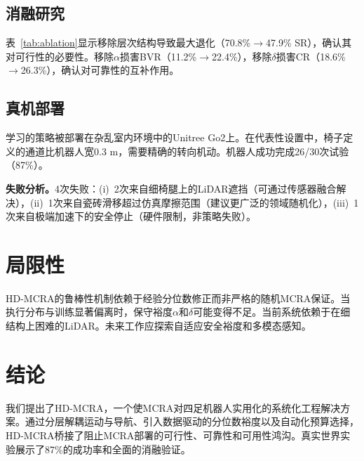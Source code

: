 \documentclass{article}
\begin{document}
\subsection{消融研究}

表~\ref{tab:ablation}显示移除层次结构导致最大退化（70.8\%$\to$47.9\% SR），确认其对可行性的必要性。移除$\alpha$损害BVR（11.2\%$\to$22.4\%），移除$\delta$损害CR（18.6\%$\to$26.3\%），确认对可靠性的互补作用。

\begin{table}[t]
\caption{层次结构和保守裕度的消融研究。}
\label{tab:ablation}
\centering
{}
\end{table}

\subsection{真机部署}

学习的策略被部署在杂乱室内环境中的Unitree Go2上。在代表性设置中，椅子定义的通道比机器人宽0.3 m，需要精确的转向机动。机器人成功完成26/30次试验（87\%）。

\textbf{失败分析。}4次失败：(i)~2次来自细椅腿上的LiDAR遮挡（可通过传感器融合解决），(ii)~1次来自瓷砖滑移超过仿真摩擦范围（建议更广泛的领域随机化），(iii)~1次来自极端加速下的安全停止（硬件限制，非策略失败）。

\section{局限性}

HD-MCRA的鲁棒性机制依赖于经验分位数修正而非严格的随机MCRA保证。当执行分布与训练显著偏离时，保守裕度$\alpha$和$\delta$可能变得不足。当前系统依赖于在细结构上困难的LiDAR。未来工作应探索自适应安全裕度和多模态感知。

\section{结论}

我们提出了HD-MCRA，一个使MCRA对四足机器人实用化的系统化工程解决方案。通过分层解耦运动与导航、引入数据驱动的分位数裕度以及自动化预算选择，HD-MCRA桥接了阻止MCRA部署的可行性、可靠性和可用性鸿沟。真实世界实验展示了87\%的成功率和全面的消融验证。



\end{document}
